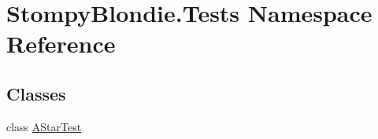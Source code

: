 \hypertarget{namespace_stompy_blondie_1_1_tests}{}\section{Stompy\+Blondie.\+Tests Namespace Reference}
\label{namespace_stompy_blondie_1_1_tests}
\subsection*{Classes}
\begin{DoxyCompactItemize}
\item 
class \mbox{\hyperlink{class_stompy_blondie_1_1_tests_1_1_a_star_test}{A\+Star\+Test}}
\end{DoxyCompactItemize}
